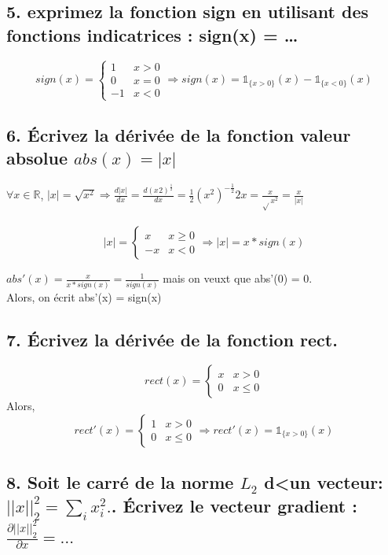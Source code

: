 \documentclass[12pt]{article}
\begin{document}
\subsection{5. exprimez la fonction sign en utilisant des fonctions indicatrices : sign(x) = \dots}

\[ 
sign(x) = 
\begin{cases} 
      1 &  x > 0 \\
      0 &  x = 0 \\
      -1 &  x < 0 
   \end{cases}
\Rightarrow sign(x) = \mathbb{1}_{\{x > 0\}}(x) - \mathbb{1}_{\{x < 0\}}(x)
\]

\subsection{6. Écrivez la dérivée de la fonction valeur absolue $abs(x) = |x|$}

$\forall x \in \mathbb{R}$,    $|x| = \sqrt{x^{2}} \Rightarrow \frac{d|x|}{dx} = \frac{d(x^{}2)^{\frac{1}{2}}}{dx} = \frac{1}{2}(x^{2})^{-\frac{1}{2}}2x = \frac{x}{\sqrt{}x^{2}} = \frac{x}{|x|}$ \\
\\
\[ 
|x| = 
\begin{cases} 
      x &  x \geq 0 \\
      -x &  x < 0 
   \end{cases}
\Rightarrow |x| = x*sign(x)
\]

$abs'(x) = \frac{x}{x*sign(x)} = \frac{1}{sign(x)}$ mais on veuxt que abs'(0) = 0. \\
Alors, on écrit abs'(x) = sign(x)

\subsection{7. Écrivez la dérivée de la fonction rect.}
\[ 
rect(x) = 
\begin{cases} 
      x &  x > 0 \\
     0 &  x \leq 0 
   \end{cases}
\]
Alors,
\[ 
rect'(x) = 
\begin{cases} 
     1 &  x > 0 \\
     0 &  x \leq 0 
   \end{cases}
\Rightarrow rect'(x) = \mathbb{1}_{\{x > 0\}}(x)
\]

\subsection{8. Soit le carré de la norme $L_{2}$ d<un vecteur: $||x||_{2}^{2}= \sum_{i}x_{i}^{2}.$. Écrivez le vecteur gradient : $\frac{\partial||x||_{2}^{2}}{\partial x} = \dots$}
\end{document}
